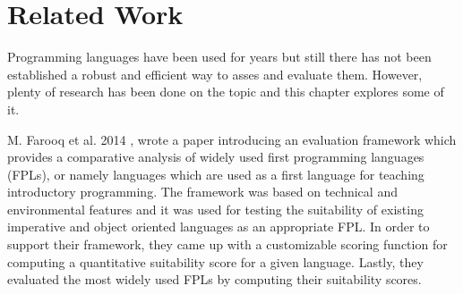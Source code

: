 \chapter{Related Work}
\label{chap:related_work}

Programming languages have been used for years but still there has not been established a robust and efficient way to asses and evaluate them. However, plenty of research has been done on the topic and this chapter explores some of it.

M. Farooq et al. 2014 , wrote a paper introducing an evaluation framework which provides a comparative analysis of widely used first programming languages (FPLs), or namely languages which are used as a first language for teaching introductory programming. The framework was based on technical and environmental features and it was used for testing the suitability of existing imperative and object oriented languages as an appropriate FPL. In order to support their framework, they came up with a customizable scoring function for computing a quantitative suitability score for a given language. Lastly, they evaluated the most widely used FPLs by computing their suitability scores. 